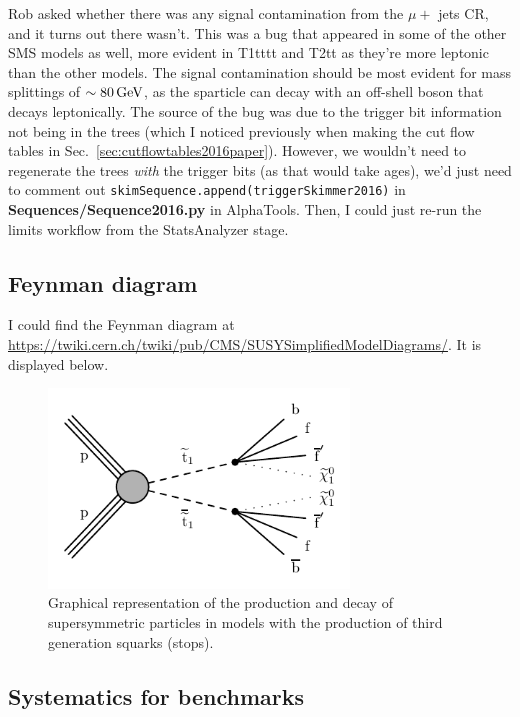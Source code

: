 
Rob asked whether there was any signal contamination from the $\mu +$ jets CR, and it turns out there wasn't. This was a bug that appeared in some of the other SMS models as well, more evident in T1tttt and T2tt as they're more leptonic than the other models. The signal contamination should be most evident for mass splittings of $\sim 80\,\text{G\text{e\kern-0.15ex V}}$, as the sparticle can decay with an off-shell \PW boson that decays leptonically. The source of the bug was due to the trigger bit information not being in the trees (which I noticed previously when making the cut flow tables in Sec.~\ref{sec:cutflowtables2016paper}). However, we wouldn't need to regenerate the trees \emph{with} the trigger bits (as that would take ages), we'd just need to comment out \texttt{skimSequence.append(triggerSkimmer2016)} in \textbf{Sequences/Sequence2016.py} in AlphaTools. Then, I could just re-run the limits workflow from the StatsAnalyzer stage.


\subsection{Feynman diagram}

I could find the Feynman diagram at \url{https://twiki.cern.ch/twiki/pub/CMS/SUSYSimplifiedModelDiagrams/}. It is displayed below.

\begin{figure}[htbp]
\centering
\includegraphics[width=80mm]{./sec31/T2tt-4bd_Feynman_diagram.pdf}
\caption{Graphical representation of the production and decay of supersymmetric particles in models with the production of third generation squarks (stops).}
\end{figure}


\subsection{Systematics for benchmarks}

